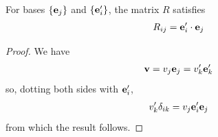 \documentclass{../template/note}
\begin{document}
    \begin{definition}
        \label{transformation-matrix}
        For bases \(\{\V e_j\}\) and \(\{\V e_i'\}\), the matrix \(R\) satisfies
        \begin{align*}
            R_{ij} = \V e_i' \cdot \V e_j
        \end{align*}
    \end{definition}

    \begin{proof}
        We have
        \begin{align*}
            \V v = v_j \V e _j = v_k' \V e_k'
        \end{align*}
        so, dotting both sides with \(\V e_i'\),
        \begin{align*}
            v'_k \delta_{ik} = v_j \V e_i' \V e_j
        \end{align*}
        from which the result follows.
    \end{proof}
    
\end{document}
